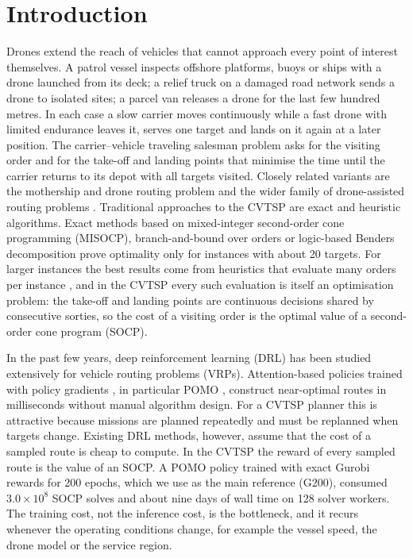 \documentclass[preprint,review,12pt,authoryear]{elsarticle}
\begin{document}
\section{Introduction}\label{sec:intro}

Drones extend the reach of vehicles that cannot approach every point of interest themselves. A patrol vessel
inspects offshore platforms, buoys or ships with a drone launched from its deck; a relief truck on a damaged
road network sends a drone to isolated sites; a parcel van releases a drone for the last few hundred metres.
In each case a slow carrier moves continuously while a fast drone with limited endurance leaves it, serves one
target and lands on it again at a later position. The carrier--vehicle traveling salesman problem
\citep[CVTSP;][]{garone2010cooperative,gambella2018exact} asks for the visiting order and for the take-off and
landing points that minimise the time until the carrier returns to its depot with all targets visited. Closely
related variants are the mothership and drone routing problem \citep{poikonen2020mothership} and the wider
family of drone-assisted routing problems
\citep{murray2015flying,agatz2018optimization,otto2018optimization,macrina2020drone,chung2020optimization}.
Traditional approaches to the CVTSP are exact and heuristic algorithms. Exact methods based on mixed-integer
second-order cone programming (MISOCP), branch-and-bound over orders or logic-based Benders decomposition
\citep{gambella2018exact,erdogan2021exact,li2025exact} prove optimality only for instances with about 20
targets. For larger instances the best results come from heuristics that evaluate many orders per instance
\citep{poikonen2020mothership,li2025exact}, and in the CVTSP every such evaluation is itself an optimisation
problem: the take-off and landing points are continuous decisions shared by consecutive sorties, so the cost
of a visiting order is the optimal value of a second-order cone program (SOCP).

In the past few years, deep reinforcement learning (DRL) has been studied extensively for vehicle routing
problems (VRPs). Attention-based policies trained with policy gradients \citep{kool2019attention}, in particular
POMO \citep{kwon2020pomo}, construct near-optimal routes in milliseconds without manual algorithm design. For a
CVTSP planner this is attractive because missions are planned repeatedly and must be replanned when targets
change. Existing DRL methods, however, assume that the cost of a sampled route is cheap to compute. In the
CVTSP the reward of every sampled route is the value of an SOCP. A POMO policy trained with exact Gurobi rewards
for 200 epochs, which we use as the main reference (G200), consumed $3.0\times10^{8}$ SOCP solves and about nine
days of wall time on 128 solver workers. The training cost, not the inference cost, is the bottleneck, and it
recurs whenever the operating conditions change, for example the vessel speed, the drone model or the service
region.
\end{document}
